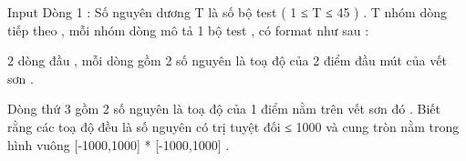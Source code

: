 Input
Dòng 1 : Số nguyên dương T là số bộ test ( 1 ≤ T ≤ 45 ) . T nhóm dòng tiếp theo , mỗi nhóm dòng mô tả 1 bộ test , có format như sau :   


   2 dòng đầu , mỗi dòng gồm 2 số nguyên là toạ độ của 2 điểm đầu mút của vết sơn .   


   Dòng thứ 3 gồm 2 số nguyên là toạ độ của 1 điểm nằm trên vết sơn đó . Biết rằng các toạ độ đều là số nguyên có trị tuyệt đối ≤ 1000 và cung tròn nằm trong hình vuông [-1000,1000] * [-1000,1000] .